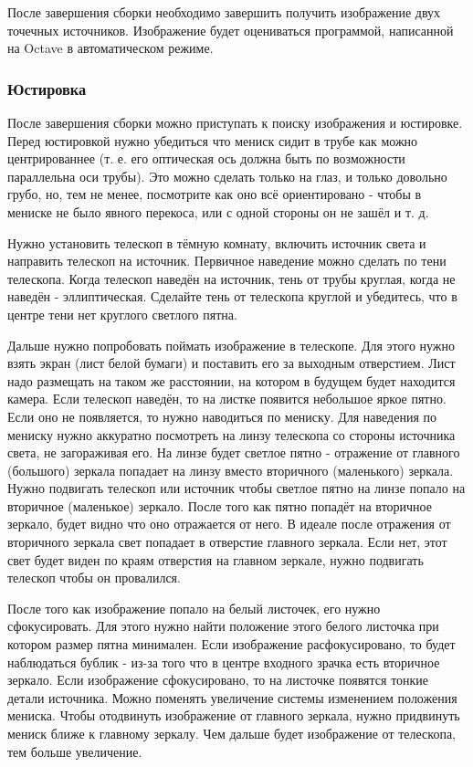 После завершения сборки необходимо завершить получить изображение двух точечных источников. Изображение будет оцениваться программой, написанной на Octave в автоматическом режиме.

\subsubsection*{Юстировка}

После завершения сборки можно приступать к поиску изображения и юстировке. Перед юстировкой нужно убедиться что мениск сидит в трубе как можно центрированнее (т. е. его оптическая ось должна быть по возможности параллельна оси трубы). Это можно сделать только на глаз, и только довольно грубо, но, тем не менее, посмотрите как оно всё ориентировано - чтобы в мениске не было явного перекоса, или с одной стороны он не зашёл и т. д.

Нужно установить телескоп в тёмную комнату, включить источник света и  направить телескоп на источник. Первичное наведение можно сделать по тени телескопа. Когда телескоп наведён на источник, тень от трубы круглая, когда не наведён - эллиптическая. Сделайте тень от телескопа круглой и убедитесь, что в центре тени нет круглого светлого пятна. 

Дальше нужно попробовать поймать изображение в телескопе. Для этого нужно взять экран (лист белой бумаги) и поставить его за выходным отверстием. Лист надо размещать на таком же расстоянии, на котором в будущем будет находится камера. Если телескоп наведён, то на листке появится небольшое яркое пятно. Если оно не появляется, то нужно наводиться по мениску. Для наведения по мениску нужно аккуратно посмотреть на линзу телескопа со стороны источника света, не загораживая его. На линзе будет светлое пятно - отражение от главного (большого) зеркала попадает на линзу вместо вторичного (маленького) зеркала. Нужно подвигать телескоп или источник  чтобы светлое пятно на линзе попало на вторичное (маленькое) зеркало. После того как пятно попадёт на вторичное зеркало, будет видно что оно отражается от него. В идеале после отражения от вторичного зеркала свет попадает в отверстие главного зеркала. Если нет, этот свет будет виден по краям отверстия на главном зеркале, нужно подвигать телескоп чтобы он провалился.

После того как изображение попало на белый листочек, его нужно сфокусировать. Для этого нужно найти положение этого белого листочка при котором размер пятна минимален. Если изображение расфокусировано, то будет наблюдаться бублик - из-за того что в центре входного зрачка есть вторичное зеркало. Если изображение сфокусировано, то на листочке появятся тонкие детали источника. Можно поменять увеличение системы изменением положения мениска. Чтобы отодвинуть изображение от главного зеркала, нужно придвинуть мениск ближе к главному зеркалу. Чем дальше будет изображение от телескопа, тем больше увеличение.

